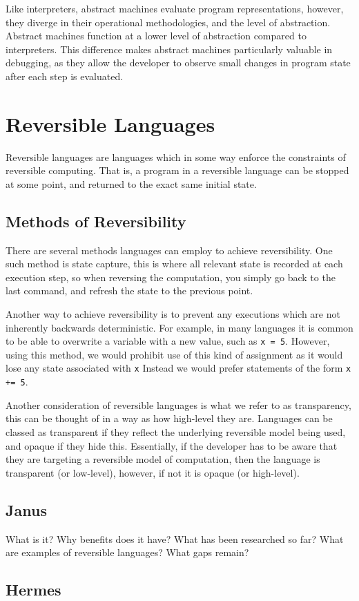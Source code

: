 Like interpreters, abstract machines evaluate program representations, however, they diverge in their operational methodologies, and the level of abstraction. Abstract machines function at a lower level of abstraction compared to interpreters. This difference makes abstract machines particularly valuable in debugging, as they allow the developer to observe small changes in program state after each step is evaluated.

\section{Reversible Languages}

Reversible languages are languages which in some way enforce the constraints of reversible computing. That is, a program in a reversible language can be stopped at some point, and returned to the exact same initial state.

\subsection{Methods of Reversibility}

There are several methods languages can employ to achieve reversibility. One such method is state capture, this is where all relevant state is recorded at each execution step, so when reversing the computation, you simply go back to the last command, and refresh the state to the previous point.

Another way to achieve reversibility is to prevent any executions which are not inherently backwards deterministic. For example, in many languages it is common to be able to overwrite a variable with a new value, such as \lstinline{x = 5}. However, using this method, we would prohibit use of this kind of assignment as it would lose any state associated with \lstinline{x} Instead we would prefer statements of the form \lstinline{x += 5}.

Another consideration of reversible languages is what we refer to as transparency, this can be thought of in a way as how high-level they are. Languages can be classed as transparent if they reflect the underlying reversible model being used, and opaque if they hide this. Essentially, if the developer has to be aware that they are targeting a reversible model of computation, then the language is transparent (or low-level), however, if not it is opaque (or high-level).


\subsection{Janus}

What is it?
Why benefits does it have?
What has been researched so far?
What are examples of reversible languages?
What gaps remain?

\subsection{Hermes}

\subsection{\rimplang}
